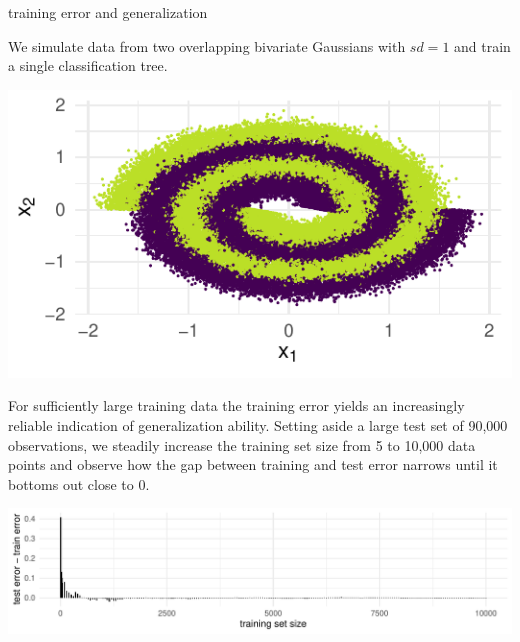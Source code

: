 \documentclass[11pt,compress,t,notes=noshow, xcolor=table]{beamer}
\begin{document}
\begin{vbframe}{training error and generalization}

\begin{minipage}[c]{0.6\textwidth}
  We simulate data from two overlapping bivariate Gaussians with $sd = 1$ and 
  train a single classification tree.
\end{minipage}%
\begin{minipage}[c]{0.05\textwidth}
  \phantom{foo}
\end{minipage}%
\begin{minipage}[c]{0.35\textwidth}
  \includegraphics[width = \textwidth]{figure/eval_delta_train_test_err_data}
\end{minipage}%

\vfill

For sufficiently large training data the training error yields an increasingly 
reliable indication of generalization ability.
Setting aside a large test set of 90,000 observations, we steadily increase the 
training set size from 5 to 10,000 data points and observe how the gap between 
training and test error narrows until it bottoms out close to 0.

\vfill

\includegraphics[width = \textwidth]{figure/eval_delta_train_test_err}

\end{vbframe}


\endlecture
\end{document}
